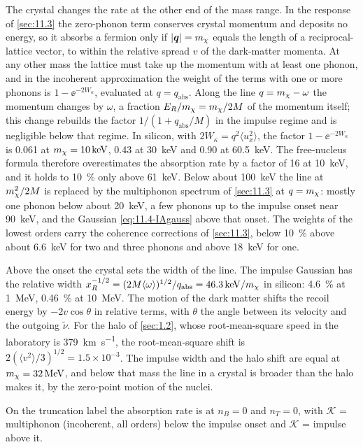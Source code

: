 The crystal changes the rate at the other end of the mass range. In the response of \cref{sec:11.3} the zero-phonon term conserves crystal momentum and deposits no energy, so it absorbs a fermion only if $|\bm{q}| = m_{\chi}$ equals the length of a reciprocal-lattice vector, to within the relative spread $v$ of the dark-matter momenta. At any other mass the lattice must take up the momentum with at least one phonon, and in the incoherent approximation the weight of the terms with one or more phonons is $1 - \ee^{-2W_\kappa}$, evaluated at $q = q_{\mathrm{abs}}$. Along the line $q = m_{\chi} - \omega$ the momentum changes by $\omega$, a fraction $E_R/m_{\chi} = m_{\chi}/2M$ of the momentum itself; this change rebuilds the factor $1/(1 + q_{\mathrm{abs}}/M)$ in the impulse regime and is negligible below that regime. In silicon, with $2W_\kappa = q^2\langle u_x^2\rangle$, the factor $1 - \ee^{-2W_\kappa}$ is 0.061 at $m_{\chi} = \SI{10}{keV}$, 0.43 at \SI{30}{keV} and 0.90 at \SI{60.5}{keV}. The free-nucleus formula therefore overestimates the absorption rate by a factor of 16 at \SI{10}{keV}, and it holds to \SI{10}{\percent} only above \SI{61}{keV}. Below about \SI{100}{keV} the line at $m_{\chi}^2/2M$ is replaced by the multiphonon spectrum of \cref{sec:11.3} at $q = m_{\chi}$: mostly one phonon below about \SI{20}{keV}, a few phonons up to the impulse onset near \SI{90}{keV}, and the Gaussian \cref{eq:11.4-IAgauss} above that onset. The weights of the lowest orders carry the coherence corrections of \cref{sec:11.3}, below \SI{10}{\percent} above about \SI{6.6}{keV} for two and three phonons and above \SI{18}{keV} for one.

Above the onset the crystal sets the width of the line. The impulse Gaussian has the relative width $x_R^{-1/2} = (2M\langle\omega\rangle)^{1/2}/q_{\mathrm{abs}} = \SI{46.3}{keV}/m_{\chi}$ in silicon: \SI{4.6}{\percent} at \SI{1}{MeV}, \SI{0.46}{\percent} at \SI{10}{MeV}. The motion of the dark matter shifts the recoil energy by $-2v\cos\theta$ in relative terms, with $\theta$ the angle between its velocity and the outgoing $\tilde\nu$. For the halo of \cref{sec:1.2}, whose root-mean-square speed in the laboratory is \SI{379}{km.s^{-1}}, the root-mean-square shift is $2(\langle v^2\rangle/3)^{1/2} = 1.5\times10^{-3}$. The impulse width and the halo shift are equal at $m_{\chi} = \SI{32}{MeV}$, and below that mass the line in a crystal is broader than the halo makes it, by the zero-point motion of the nuclei.

On the truncation label the absorption rate is at $n_B = 0$ and $n_T = 0$, with $\mathcal{K}$ = multiphonon (incoherent, all orders) below the impulse onset and $\mathcal{K}$ = impulse above it.

